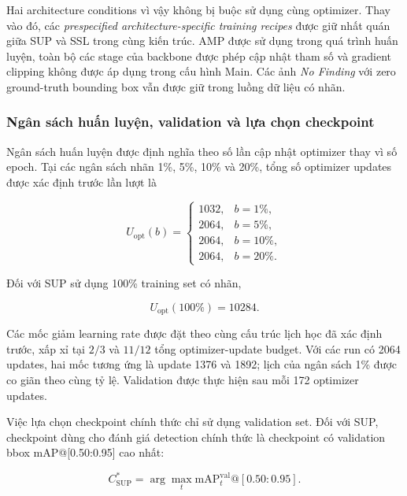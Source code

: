 \documentclass[pdflatex,sn-mathphys-num]{sn-jnl}%
\theoremstyle{thmstyleone}%
\theoremstyle{thmstyletwo}%
\theoremstyle{thmstylethree}%
\begin{document}
Hai architecture conditions vì vậy không bị buộc sử dụng cùng optimizer.
Thay vào đó, các \textit{prespecified architecture-specific training
recipes} được giữ nhất quán giữa SUP và SSL trong cùng kiến trúc. AMP được
sử dụng trong quá trình huấn luyện, toàn bộ các stage của backbone được
phép cập nhật tham số và gradient clipping không được áp dụng trong cấu
hình Main. Các ảnh \textit{No Finding} với zero ground-truth bounding box
vẫn được giữ trong luồng dữ liệu có nhãn.

\subsubsection{Ngân sách huấn luyện, validation và lựa chọn checkpoint}
\label{subsubsec:training_budget_checkpoint}

Ngân sách huấn luyện được định nghĩa theo số lần cập nhật optimizer thay
vì số epoch. Tại các ngân sách nhãn 1\%, 5\%, 10\% và 20\%, tổng số
optimizer updates được xác định trước lần lượt là

\begin{equation}
U_{\mathrm{opt}}(b)
=
\begin{cases}
1032, & b=1\%,\\
2064, & b=5\%,\\
2064, & b=10\%,\\
2064, & b=20\%.
\end{cases}
\label{eq:optimizer_update_budget}
\end{equation}

Đối với SUP sử dụng 100\% training set có nhãn,

\begin{equation}
U_{\mathrm{opt}}(100\%)=10284.
\label{eq:sup100_optimizer_updates}
\end{equation}

Các mốc giảm learning rate được đặt theo cùng cấu trúc lịch học đã xác định
trước, xấp xỉ tại \(2/3\) và \(11/12\) tổng optimizer-update budget. Với
các run có 2064 updates, hai mốc tương ứng là update 1376 và 1892; lịch
của ngân sách 1\% được co giãn theo cùng tỷ lệ. Validation được thực hiện
sau mỗi 172 optimizer updates.

Việc lựa chọn checkpoint chính thức chỉ sử dụng validation set. Đối với
SUP, checkpoint dùng cho đánh giá detection chính thức là checkpoint có
validation bbox mAP@[0.50:0.95] cao nhất:

\begin{equation}
C_{\mathrm{SUP}}^{*}
=
\arg\max_t
\mathrm{mAP}^{\mathrm{val}}_t@[0.50:0.95].
\label{eq:sup_best_checkpoint}
\end{equation}
\end{document}
